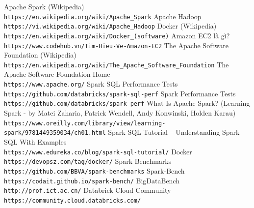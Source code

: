 \documentclass[11pt,a4paper]{article}
\begin{document}
\newpage
\begin{thebibliography}{80}
Apache Spark (Wikipedia)
\\\texttt{https://en.wikipedia.org/wiki/Apache\_Spark}
Apache Hadoop
\\\texttt{https://vi.wikipedia.org/wiki/Apache\_Hadoop}
Docker (Wikipedia)
\\\texttt{https://en.wikipedia.org/wiki/Docker\_(software)}
Amazon EC2 là gì?
\\\texttt{https://www.codehub.vn/Tim-Hieu-Ve-Amazon-EC2}
The Apache Software Foundation (Wikipedia)
\\\texttt{https://en.wikipedia.org/wiki/The\_Apache\_Software\_Foundation}
The Apache Software Foundation Home
\\\texttt{https://www.apache.org/}
Spark SQL Performance Tests
\\\texttt{https://github.com/databricks/spark-sql-perf}
Spark Performance Tests
\\\texttt{https://github.com/databricks/spark-perf}
What Is Apache Spark? (Learning Spark - by Matei Zaharia, Patrick Wendell, Andy Konwinski, Holden Karau)
\\\texttt{https://www.oreilly.com/library/view/learning-spark/9781449359034/ch01.html}
Spark SQL Tutorial – Understanding Spark SQL With Examples
\\\texttt{https://www.edureka.co/blog/spark-sql-tutorial/}
Docker
\\\texttt{https://devopsz.com/tag/docker/}
Spark Benchmarks
\\\texttt{https://github.com/BBVA/spark-benchmarks}
Spark-Bench
\\\texttt{https://codait.github.io/spark-bench/}
BigDataBench
\\\texttt{http://prof.ict.ac.cn/}
Databrick Cloud Community
\\\texttt{https://community.cloud.databricks.com/}


\end{thebibliography}
\end{document}
